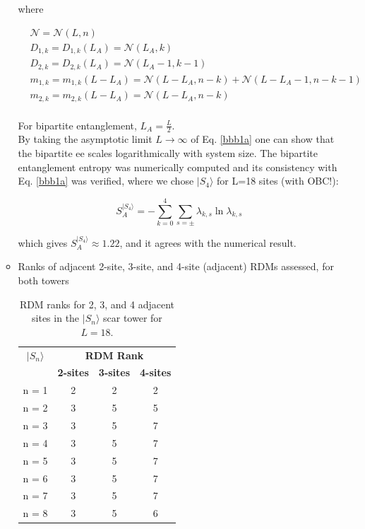 \documentclass[11pt]{article}
\begin{document}
\begin{itemize}
\begin{itemize}
        where
        
        \begin{align}
        &\mathcal{N} = \mathcal{N}\left(L, n\right)\\
        &D_{1,k} = D_{1,k}\left(L_A\right) = \mathcal{N}\left(L_A, k\right)\\
        &D_{2,k} = D_{2,k}\left(L_A\right) = \mathcal{N}\left(L_A - 1, k - 1\right)\\
        &m_{1,k} = m_{1,k}\left(L-L_A\right) = \mathcal{N}\left(L-L_A, n-k\right) + \mathcal{N}\left(L-L_A -1, n-k -1\right)\\
        &m_{2,k} = m_{2,k}\left(L-L_A\right) = \mathcal{N}\left(L-L_A, n-k\right)\\
        \end{align}
        
        For bipartite entanglement, $L_A = \frac{L}{2}$.\\
        By taking the asymptotic limit $L\rightarrow\infty$ of Eq. \eqref{bbb1a} one can show that the bipartite ee scales logarithmically with system size.
        The bipartite entanglement entropy was numerically computed and its consistency with Eq. \eqref{bbb1a} was verified, where we chose $|S_4\rangle$ for L=18 sites (with OBC!):
        
        \begin{equation}
        S^{|S_4\rangle }_A = - \sum_{k=0}^{4}\sum_{s=\pm} \lambda_{k,s} \ln \lambda_{k,s}
        \end{equation}
        
        which gives $S^{|S_4\rangle }_A \approx 1.22$, and it agrees with the numerical result.\\
        
        \item Ranks of adjacent 2-site, 3-site, and 4-site (adjacent) RDMs assessed, for both towers
        
        \begin{table}[H]
	\centering
	\begin{tabular}{|c|ccc|}
	\hline
	\textbf{$|S_n\rangle$} & \multicolumn{3}{c|}{\textbf{RDM Rank}} \\
	\cline{2-4}
	& \textbf{2-sites} & \textbf{3-sites} & \textbf{4-sites} \\
	\hline
	 n = 1 & 2 & 2 & 2 \\
	 n = 2 & 3 & 5 & 5 \\
	 n = 3 & 3 & 5 & 7 \\
	 n = 4 & 3 & 5 & 7 \\  
	 n = 5 & 3 & 5 & 7 \\
	 n = 6 & 3 & 5 & 7 \\
	 n = 7 & 3 & 5 & 7 \\
	 n = 8 & 3 & 5 & 6 \\
	\hline
	\end{tabular}
	\caption{RDM ranks for 2, 3, and 4 adjacent sites in the $|S_n\rangle$ scar tower for $L=18$.}
	\label{tab:ranks1}
	\end{table}


\end{itemize}
\end{itemize}
\end{document}
